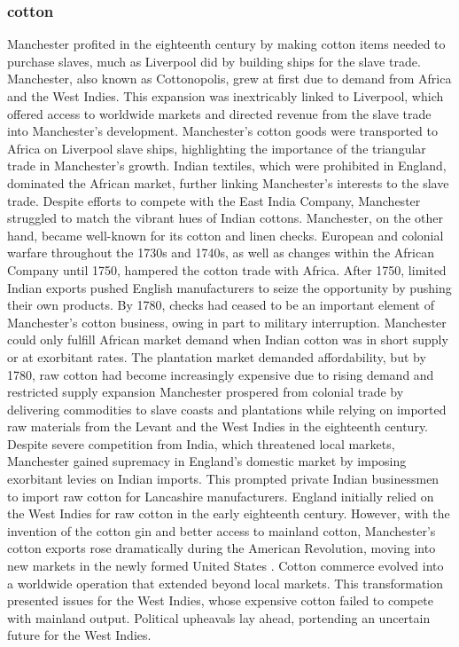 \subsubsection{cotton}
Manchester profited in the eighteenth century by making cotton items needed to purchase slaves, much as Liverpool did by building ships for the slave trade. Manchester, also known as Cottonopolis, grew at first due to demand from Africa and the West Indies. This expansion was inextricably linked to Liverpool, which offered access to worldwide markets and directed revenue from the slave trade into Manchester's development. Manchester's cotton goods were transported to Africa on Liverpool slave ships, highlighting the importance of the triangular trade in Manchester's growth. Indian textiles, which were prohibited in England, dominated the African market, further linking Manchester's interests to the slave trade. Despite efforts to compete with the East India Company, Manchester struggled to match the vibrant hues of Indian cottons. Manchester, on the other hand, became well-known for its cotton and linen checks. European and colonial warfare throughout the 1730s and 1740s, as well as changes within the African Company until 1750, hampered the cotton trade with Africa. After 1750, limited Indian exports pushed English manufacturers to seize the opportunity by pushing their own products. By 1780, checks had ceased to be an important element of Manchester's cotton business, owing in part to military interruption. Manchester could only fulfill African market demand when Indian cotton was in short supply or at exorbitant rates. The plantation market demanded affordability, but by 1780, raw cotton had become increasingly expensive due to rising demand and restricted supply expansion  Manchester prospered from colonial trade by delivering commodities to slave coasts and plantations while relying on imported raw materials from the Levant and the West Indies in the eighteenth century. Despite severe competition from India, which threatened local markets, Manchester gained supremacy in England's domestic market by imposing exorbitant levies on Indian imports. This prompted private Indian businessmen to import raw cotton for Lancashire manufacturers. England initially relied on the West Indies for raw cotton in the early eighteenth century. However, with the invention of the cotton gin and better access to mainland cotton, Manchester's cotton exports rose dramatically during the American Revolution, moving into new markets in the newly formed United States . Cotton commerce evolved into a worldwide operation that extended beyond local markets. This transformation presented issues for the West Indies, whose expensive cotton failed to compete with mainland output. Political upheavals lay ahead, portending an uncertain future for the West Indies.
